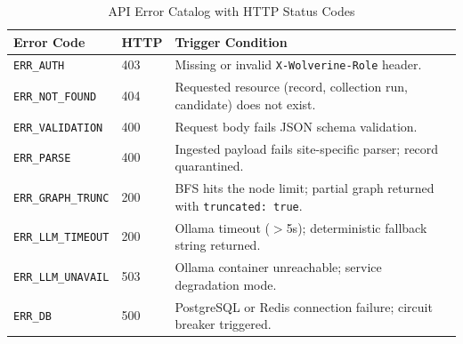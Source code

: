 \begin{table}[htbp]
\centering
\begin{tabular}{p{} p{} p{}}
\toprule
\textbf{Error Code} & \textbf{HTTP} & \textbf{Trigger Condition} \\
\midrule
\texttt{ERR\_AUTH} & 403 & Missing or invalid \texttt{X-Wolverine-Role} header. \\
\texttt{ERR\_NOT\_FOUND} & 404 & Requested resource (record, collection run, candidate) does not exist. \\
\texttt{ERR\_VALIDATION} & 400 & Request body fails JSON schema validation. \\
\texttt{ERR\_PARSE} & 400 & Ingested payload fails site-specific parser; record quarantined. \\
\texttt{ERR\_GRAPH\_TRUNC} & 200 & BFS hits the node limit; partial graph returned with \texttt{truncated: true}. \\
\texttt{ERR\_LLM\_TIMEOUT} & 200 & Ollama timeout ($>$5s); deterministic fallback string returned. \\
\texttt{ERR\_LLM\_UNAVAIL} & 503 & Ollama container unreachable; service degradation mode. \\
\texttt{ERR\_DB} & 500 & PostgreSQL or Redis connection failure; circuit breaker triggered. \\
\bottomrule
\end{tabular}
\caption{API Error Catalog with HTTP Status Codes}
\label{tab:app-api-errors}
\end{table}
